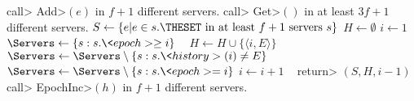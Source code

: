   \begin{algorithm}[H]
    \label{DPO}
    \small
    \begin{algorithmic}[1]
      \State \<call> \<Add>\((e)\) in \(f+1\) different servers.
      \EndFunction
      \State \<call> \<Get>\(()\) in at least \(3f+1\) different servers.
      \State $S \leftarrow \{ e | e\in{}s.\THESET \text{ in at least } f+1 \text{ servers } s \}$%
      \State $H \leftarrow \emptyset$
      \State $i \leftarrow 1$
      \State $\Servers \leftarrow \{ s : s.\<epoch> \geq i \}$
      ~\label{DPO-bwhile}
        \State $H \leftarrow H \cup \{ \langle i, E \rangle \} $
        \State $\Servers \leftarrow \Servers \setminus \{ s : s.\<history>(i)\neq E\}$ 
        \State $\Servers \leftarrow \Servers\setminus \{s: s.\<epoch>=i\}$         
        \State $i \leftarrow i+1$
      \EndWhile~\label{DPO-ewhile}
      \State \<return> $(S, H, i-1)$
      \EndFunction
			\State \<call> \<EpochInc>\((h)\) in \(f+1\) different servers.
			\EndFunction
    \end{algorithmic}
  \end{algorithm}
